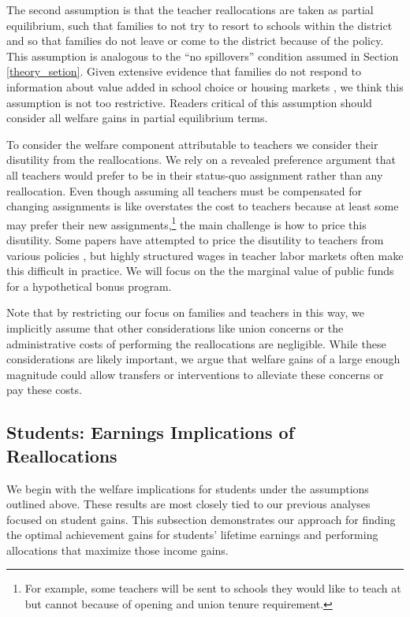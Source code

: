 \documentclass[12pt]{article}
\theoremstyle{definition}
\theoremstyle{definition}
\theoremstyle{definition}
\theoremstyle{definition}
\begin{document}
The second assumption is that the teacher reallocations are taken as partial equilibrium, such that families to not try to resort to schools within the district and so that families do not leave or come to the district because of the policy. This assumption is analogous to the ``no spillovers'' condition assumed in Section \ref{theory_setion}. Given extensive evidence that families do not respond to information about value added in school choice \citep{abdulkadirouglu2020parents} or housing markets \citep{imberman2016does}, we think this assumption is not too restrictive. Readers critical of this assumption should consider all welfare gains in partial equilibrium terms. 

To consider the welfare component attributable to teachers we consider their disutility from the reallocations. We rely on a revealed preference argument that all teachers would prefer to be in their status-quo assignment rather than any reallocation. Even though assuming all teachers must be compensated for changing assignments is like overstates the cost to teachers because at least some may prefer their new assignments,\footnote{For example, some teachers will be sent to schools they would like to teach at but cannot because of opening and union tenure requirement.} the main challenge is how to price this disutility. Some papers have attempted to price the disutility to teachers from various policies \citep[e.g.,][]{rothstein2015teacher,bates2022teacher}, but highly structured wages in teacher labor markets often make this difficult in practice. We will focus on the the marginal value of public funds \citep[MVPF,][]{Keyser_2020} for a hypothetical bonus program. %


Note that by restricting our focus on families and teachers in this way, we implicitly assume that other considerations like union concerns or the administrative costs of performing the reallocations are negligible. While these considerations are likely important, we argue that welfare gains of a large enough magnitude could allow transfers or interventions to alleviate these concerns or pay these costs.


\subsection{Students: Earnings Implications of Reallocations}

We begin with the welfare implications for students under the assumptions outlined above. These results are most closely tied to our previous analyses focused on student gains. This subsection demonstrates our approach for finding the optimal achievement gains for students' lifetime earnings and performing allocations that maximize those income gains. 
\end{document}
